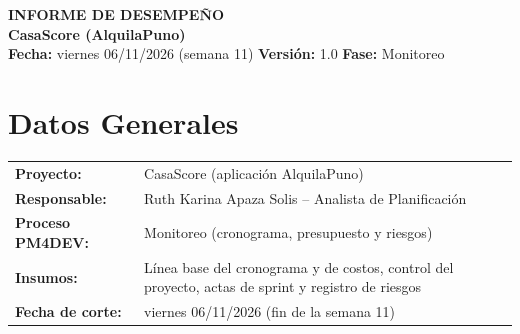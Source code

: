 \documentclass[11pt,a4paper]{article}
\begin{document}
\begin{center}
    {\Large \textbf{\textcolor{AzulUNA}{INFORME DE DESEMPEÑO}}}\\[3pt]
    {\normalsize \textbf{CasaScore (AlquilaPuno)}}\\[4pt]
    \footnotesize \textbf{Fecha:} viernes 06/11/2026 (semana 11) \quad \textbar\quad \textbf{Versión:} 1.0 \quad \textbar\quad \textbf{Fase:} Monitoreo
\end{center}

\vspace{0.1cm}

\section{Datos Generales}
\noindent\begin{tabularx}{\textwidth}{@{}P{4.2cm} L@{}}
\toprule
\textbf{Proyecto:} & CasaScore (aplicación AlquilaPuno) \\
\textbf{Responsable:} & Ruth Karina Apaza Solis -- Analista de Planificación \\
\textbf{Proceso PM4DEV:} & Monitoreo (cronograma, presupuesto y riesgos) \\
\textbf{Insumos:} & Línea base del cronograma y de costos, control del proyecto, actas de sprint y registro de riesgos \\
\textbf{Fecha de corte:} & viernes 06/11/2026 (fin de la semana 11) \\
\bottomrule
\end{tabularx}
\end{document}
